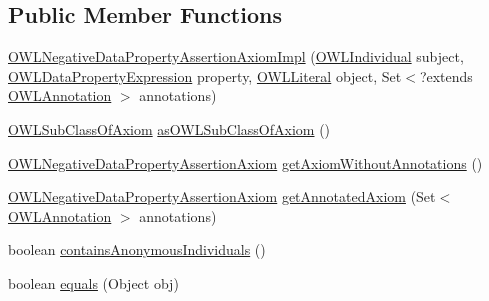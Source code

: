\subsection*{Public Member Functions}
\begin{DoxyCompactItemize}
\item 
\hyperlink{classuk_1_1ac_1_1manchester_1_1cs_1_1owl_1_1owlapi_1_1_o_w_l_negative_data_property_assertion_axiom_impl_ab90c97490ce0379d20c61add6e21ac8e}{O\-W\-L\-Negative\-Data\-Property\-Assertion\-Axiom\-Impl} (\hyperlink{interfaceorg_1_1semanticweb_1_1owlapi_1_1model_1_1_o_w_l_individual}{O\-W\-L\-Individual} subject, \hyperlink{interfaceorg_1_1semanticweb_1_1owlapi_1_1model_1_1_o_w_l_data_property_expression}{O\-W\-L\-Data\-Property\-Expression} property, \hyperlink{interfaceorg_1_1semanticweb_1_1owlapi_1_1model_1_1_o_w_l_literal}{O\-W\-L\-Literal} object, Set$<$?extends \hyperlink{interfaceorg_1_1semanticweb_1_1owlapi_1_1model_1_1_o_w_l_annotation}{O\-W\-L\-Annotation} $>$ annotations)
\item 
\hyperlink{interfaceorg_1_1semanticweb_1_1owlapi_1_1model_1_1_o_w_l_sub_class_of_axiom}{O\-W\-L\-Sub\-Class\-Of\-Axiom} \hyperlink{classuk_1_1ac_1_1manchester_1_1cs_1_1owl_1_1owlapi_1_1_o_w_l_negative_data_property_assertion_axiom_impl_ac2470f8f40455af260e752c8be74718f}{as\-O\-W\-L\-Sub\-Class\-Of\-Axiom} ()
\item 
\hyperlink{interfaceorg_1_1semanticweb_1_1owlapi_1_1model_1_1_o_w_l_negative_data_property_assertion_axiom}{O\-W\-L\-Negative\-Data\-Property\-Assertion\-Axiom} \hyperlink{classuk_1_1ac_1_1manchester_1_1cs_1_1owl_1_1owlapi_1_1_o_w_l_negative_data_property_assertion_axiom_impl_a29b3f520043b5d71eb0baddd0088f410}{get\-Axiom\-Without\-Annotations} ()
\item 
\hyperlink{interfaceorg_1_1semanticweb_1_1owlapi_1_1model_1_1_o_w_l_negative_data_property_assertion_axiom}{O\-W\-L\-Negative\-Data\-Property\-Assertion\-Axiom} \hyperlink{classuk_1_1ac_1_1manchester_1_1cs_1_1owl_1_1owlapi_1_1_o_w_l_negative_data_property_assertion_axiom_impl_a2e76500b3ee21eb725a4394c041113be}{get\-Annotated\-Axiom} (Set$<$ \hyperlink{interfaceorg_1_1semanticweb_1_1owlapi_1_1model_1_1_o_w_l_annotation}{O\-W\-L\-Annotation} $>$ annotations)
\item 
boolean \hyperlink{classuk_1_1ac_1_1manchester_1_1cs_1_1owl_1_1owlapi_1_1_o_w_l_negative_data_property_assertion_axiom_impl_ae03f360fa56ca835b31f6e6db4a07942}{contains\-Anonymous\-Individuals} ()
\item 
boolean \hyperlink{classuk_1_1ac_1_1manchester_1_1cs_1_1owl_1_1owlapi_1_1_o_w_l_negative_data_property_assertion_axiom_impl_a848071507eeac3ea8488114cfc7511b3}{equals} (Object obj)

\end{DoxyCompactItemize}

